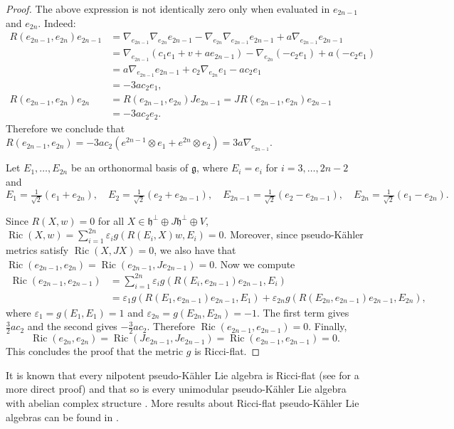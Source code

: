 \documentclass{article}
\theoremstyle{definition}
\DeclareMathOperator{\Ric}{Ric}
\newcommand{\frg}{\mathfrak{g}}
\newcommand{\frh}{\mathfrak{h}}
\begin{document}
\begin{proof}
    The above expression is not identically zero only when evaluated in $e_{2n-1}$ and $e_{2n}$. Indeed: \begin{align*}
        R(e_{2n-1},e_{2n})e_{2n-1}&=\nabla_{e_{2n-1}}\nabla_{e_{2n}}e_{2n-1}-\nabla_{e_{2n}}\nabla_{e_{2n-1}}e_{2n-1}+a\nabla_{e_{2n-1}}e_{2n-1}\\
        &=\nabla_{e_{2n-1}}(c_1e_1+v+ae_{2n-1})-\nabla_{e_{2n}}(-c_2e_1)+a(-c_2e_1)\\
        &=a\nabla_{e_{2n-1}}e_{2n-1}+c_2\nabla_{e_{2n}}e_1-ac_2e_1\\
        &=-3ac_2e_1,\\
        R(e_{2n-1},e_{2n})e_{2n}&=R(e_{2n-1},e_{2n})Je_{2n-1}=JR(e_{2n-1},e_{2n})e_{2n-1}\\
        &=-3ac_2e_2.
    \end{align*}
    Therefore we conclude that $R(e_{2n-1},e_{2n})=-3ac_2(e^{2n-1}\otimes e_1+e^{2n}\otimes e_2)=3a\nabla_{e_{2n-1}}$.\medskip

    Let $E_1,\ldots,E_{2n}$ be an orthonormal basis of $\frg$, where $E_i=e_i$ for $i=3,\ldots,2n-2$ and $$E_1=\tfrac{1}{\sqrt{2}}(e_1+e_{2n}),\quad E_2=\tfrac{1}{\sqrt{2}}(e_2+e_{2n-1}),\quad E_{2n-1}=\tfrac{1}{\sqrt{2}}(e_2-e_{2n-1}),\quad E_{2n}=\tfrac{1}{\sqrt{2}}(e_1-e_{2n}).$$

    Since $R(X,w)=0$ for all $X\in\frh^\perp\oplus J\frh^\perp\oplus V$, $\Ric(X,w)=\sum_{i=1}^{2n}\varepsilon_ig(R(E_i,X)w,E_i)=0$. Moreover, since pseudo-K\"ahler metrics satisfy $\Ric(X,JX)=0$, we also have that $\Ric(e_{2n-1},e_{2n})=\Ric(e_{2n-1},Je_{2n-1})=0$. Now we compute \begin{align*}
        \Ric(e_{2n-1},e_{2n-1})&=\sum_{i=1}^{2n}\varepsilon_ig(R(E_i,e_{2n-1})e_{2n-1},E_i)\\
        &=\varepsilon_1g(R(E_1,e_{2n-1})e_{2n-1},E_1)+\varepsilon_{2n}g(R(E_{2n},e_{2n-1})e_{2n-1},E_{2n}),
    \end{align*} where $\varepsilon_1=g(E_1,E_1)=1$ and $\varepsilon_{2n}=g(E_{2n},E_{2n})=-1$. The first term gives $\frac{3}{2}ac_2$ and the second gives $-\frac{3}{2}ac_2$. Therefore $\Ric(e_{2n-1},e_{2n-1})=0$. Finally,
    \[\Ric(e_{2n},e_{2n})=\Ric(Je_{2n-1},Je_{2n-1})=\Ric(e_{2n-1},e_{2n-1})=0.\] This concludes the proof that the metric $g$ is Ricci-flat.
\end{proof}

It is known that every nilpotent pseudo-Kähler Lie algebra is Ricci-flat \cite[Lemma 6.4]{FinoPartonSalamon} (see \cite[Lemma 1.7]{Conti_Rossi_SegnanDalmasso_2023} for a more direct proof) and that so is every unimodular pseudo-Kähler Lie algebra with abelian complex structure \cite[Corollary 4.7]{BS12}. More results about Ricci-flat pseudo-Kähler Lie algebras can be found in \cite{Yamada12}.
\end{document}

